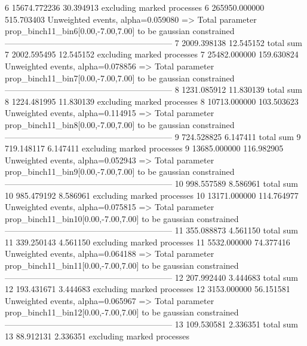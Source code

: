 6          15674.772236    30.394913       excluding marked processes    
6          265950.000000   515.703403      Unweighted events, alpha=0.059080
  => Total parameter prop_binch11_bin6[0.00,-7.00,7.00] to be gaussian constrained
------------------------------------------------------------
7          2009.398138     12.545152       total sum                     
7          2002.595495     12.545152       excluding marked processes    
7          25482.000000    159.630824      Unweighted events, alpha=0.078856
  => Total parameter prop_binch11_bin7[0.00,-7.00,7.00] to be gaussian constrained
------------------------------------------------------------
8          1231.085912     11.830139       total sum                     
8          1224.481995     11.830139       excluding marked processes    
8          10713.000000    103.503623      Unweighted events, alpha=0.114915
  => Total parameter prop_binch11_bin8[0.00,-7.00,7.00] to be gaussian constrained
------------------------------------------------------------
9          724.528825      6.147411        total sum                     
9          719.148117      6.147411        excluding marked processes    
9          13685.000000    116.982905      Unweighted events, alpha=0.052943
  => Total parameter prop_binch11_bin9[0.00,-7.00,7.00] to be gaussian constrained
------------------------------------------------------------
10         998.557589      8.586961        total sum                     
10         985.479192      8.586961        excluding marked processes    
10         13171.000000    114.764977      Unweighted events, alpha=0.075815
  => Total parameter prop_binch11_bin10[0.00,-7.00,7.00] to be gaussian constrained
------------------------------------------------------------
11         355.088873      4.561150        total sum                     
11         339.250143      4.561150        excluding marked processes    
11         5532.000000     74.377416       Unweighted events, alpha=0.064188
  => Total parameter prop_binch11_bin11[0.00,-7.00,7.00] to be gaussian constrained
------------------------------------------------------------
12         207.992440      3.444683        total sum                     
12         193.431671      3.444683        excluding marked processes    
12         3153.000000     56.151581       Unweighted events, alpha=0.065967
  => Total parameter prop_binch11_bin12[0.00,-7.00,7.00] to be gaussian constrained
------------------------------------------------------------
13         109.530581      2.336351        total sum                     
13         88.912131       2.336351        excluding marked processes    
